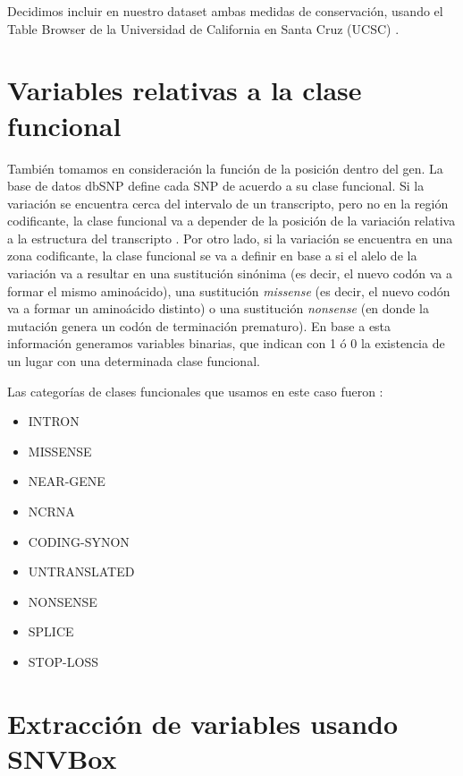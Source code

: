 Decidimos incluir en nuestro dataset ambas medidas de conservación, usando el Table Browser de la Universidad de California en Santa Cruz (UCSC) \cite{Karolchik2004}.

\section{Variables relativas a la clase funcional}

También tomamos en consideración la función de la posición dentro del gen. La base de datos dbSNP define cada SNP de acuerdo a su clase funcional. Si la variación se encuentra cerca del intervalo de un transcripto, pero no en la región codificante, la clase funcional va a depender de la posición de la variación relativa a la estructura del transcripto \cite{Kitts2014}.  Por otro lado, si la variación se encuentra en una zona codificante, la clase funcional se va a definir en base a si el alelo de la variación va a resultar en una sustitución sinónima (es decir, el nuevo codón va a formar el mismo aminoácido), una sustitución \textit{missense} (es decir, el nuevo codón va a formar un aminoácido distinto) o una sustitución \textit{nonsense} (en donde la mutación genera un codón de terminación prematuro). En base a esta información generamos variables binarias, que indican con 1 ó 0 la existencia de un lugar con una determinada clase funcional.

Las categorías de clases funcionales que usamos en este caso fueron \cite{tablefuncclasses}:
 
\begin{itemize}
    \setlength\itemsep{0em}
    \item INTRON
    \item MISSENSE
    \item NEAR-GENE
    \item NCRNA
    \item CODING-SYNON
    \item UNTRANSLATED
    \item NONSENSE
    \item SPLICE
    \item STOP-LOSS
\end{itemize}

\section{Extracción de variables usando SNVBox}

